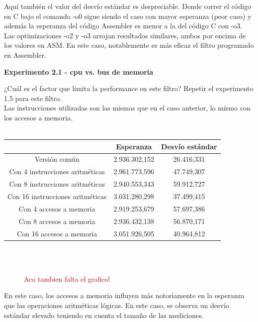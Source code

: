 Aqu\'i tambi\'en el valor del desv\'io est\'andar es despreciable. Donde correr el c\'odigo en C bajo el comando -o0 sigue siendo el caso con mayor esperanza (peor caso) y adem\'as la esperanza del c\'odigo Assembler es menor a la del c\'odigo C con -o3. Las optimizaciones -o2 y -o3 arrojan resultados similares, ambos por encima de los valores en ASM. En este caso, notablemente es m\'as eficaz el filtro programado en Assembler.



\newpage
\vspace*{0.3cm} \noindent
\textbf{Experimento 2.1 - cpu vs. bus de memoria}

¿Cuál es el factor que limita la performance en este filtro?
Repetir el experimento 1.5 para este filtro. \\

Las instrucciones utilizadas son las mismas que en el caso anterior, lo mismo con los accesos a memoria.\\
\\
 \begin{tabular}[c]{|c|c|c|}
	\hline
		 & Esperanza & Desv\'io est\'andar\\
		\hline
Versi\'on com\'un & 2.936.302,152 & 26.416,331 \\
\hline
Con 4 instrucciones aritméticas & 2.961.773,596 & 47.749,307 \\
\hline
Con 8 instrucciones aritméticas & 2.940.553,343 & 59.912,727 \\
\hline
Con 16 instrucciones aritméticas & 3.031.280,298 & 37.499,415 \\
\hline
Con 4 accesos a memoria & 2.919.253,679 & 57.697,386 \\
\hline
Con 8 accesos a memoria & 2.936.432,138 & 56.870,171 \\
\hline
Con 16 accesos a memoria & 3.051.926,505 & 40.964,812 \\
\hline
	\end{tabular}\\\\


\begin{figure}[h!]
  \begin{center}
\textcolor{red}{Aca tambien falta el grafico!}
  \end{center}
\end{figure}

En este caso, los accesos a memoria influyen m\'as notoriamente en la esperanza que las operaciones aritm\'eticas l\'ogicas. En este caso, se observa un desv\'io est\'andar elevado teniendo en cuenta el tama\~no de las mediciones.\\

